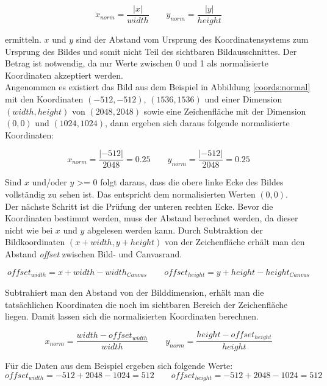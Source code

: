 \begin{equation}
 x_{norm} = \frac{|x|}{width} \qquad
 y_{norm} = \frac{|y|}{height}
\end{equation}

ermitteln. $x$ und $y$ sind der Abstand vom Ursprung des Koordinatensystems zum Ursprung des Bildes und somit nicht Teil des sichtbaren Bildausschnittes. Der Betrag ist notwendig, da nur Werte zwischen 0 und 1 als normalisierte Koordinaten akzeptiert werden.\\
Angenommen es existiert das Bild aus dem Beispiel in Abbildung \ref{coords:normal} mit den Koordinaten $(-512, -512)$, $(1536, 1536)$ und einer Dimension $(width, height)$ von $(2048, 2048)$ sowie eine Zeichenfläche mit der Dimension $(0, 0)$ und $(1024, 1024)$, dann ergeben sich daraus folgende normalisierte Koordinaten:

\begin{equation}
 x_{norm} = \frac{|-512|}{2048} = 0.25\qquad
 y_{norm} = \frac{|-512|}{2048} = 0.25
\end{equation}

Sind $x$ und/oder $y$ \textgreater= 0 folgt daraus, dass die obere linke Ecke des Bildes vollständig zu sehen ist. Das entspricht dem normalisierten Werten $(0, 0)$.\\
Der nächste Schritt ist die Prüfung der unteren rechten Ecke. Bevor die Koordinaten bestimmt werden, muss der Abstand berechnet werden, da dieser nicht wie bei $x$ und $y$ abgelesen werden kann. Durch Subtraktion der Bildkoordinaten $(x+width, y+height)$ von der Zeichenfläche erhält man den Abstand \textit{offset} zwischen Bild- und Canvasrand.

\begin{equation}
 offset_{width} = x + width - width_{Canvas}\qquad
 offset_{height} = y + height - height_{Canvas}
\end{equation}

Subtrahiert man den Abstand von der Bilddimension, erhält man die tatsächlichen Koordinaten die noch im sichtbaren Bereich der Zeichenfläche liegen. Damit lassen sich die normalisierten Koordinaten berechnen.

\begin{equation}
 x_{norm} = \frac{width - offset_{width}}{width} \qquad
 y_{norm} = \frac{height - offset_{height}}{height}
\end{equation}

Für die Daten aus dem Beispiel ergeben sich folgende Werte:
\begin{equation}
 offset_{width} = -512 + 2048 -1024 = 512\qquad
 offset_{height} = -512 + 2048 -1024 = 512
\end{equation}


